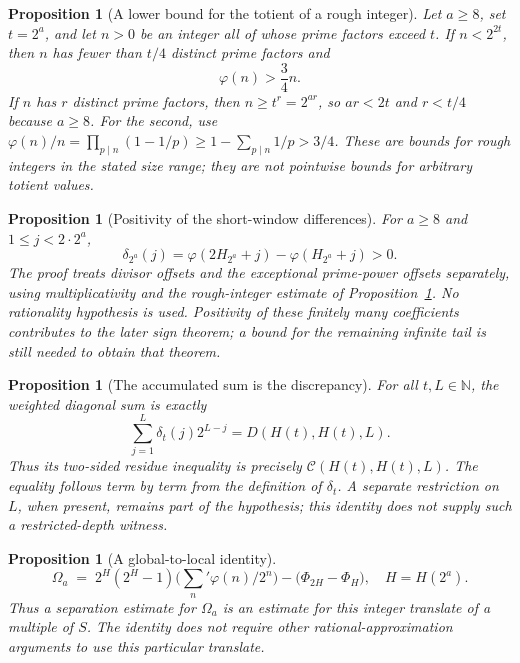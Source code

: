\documentclass[11pt]{article}
\theoremstyle{plain}
\newtheorem{prop}[thm]{Proposition}
\theoremstyle{definition}
\theoremstyle{remark}
\begin{document}
\begin{prop}[A lower bound for the totient of a rough integer]\label{prop:AR-03-inv}
Let $a\ge8$, set $t=2^a$, and let $n>0$ be an integer all of
whose prime factors exceed $t$. If $n<2^{2t}$, then $n$ has fewer
than $t/4$ distinct prime factors and
\[
 \varphi(n)>\frac34 n.
\]
If $n$ has $r$ distinct prime factors, then
$n\ge t^r=2^{ar}$, so $ar<2t$ and $r<t/4$ because $a\ge8$.
For the second, use
$\varphi(n)/n=\prod_{p\mid n}(1-1/p)\ge1-\sum_{p\mid n}1/p>3/4$.
These are bounds for rough integers in the stated size range; they are
not pointwise bounds for arbitrary totient values.

\end{prop}

\begin{prop}[Positivity of the short-window differences]\label{prop:AR-05-inv}
For $a\ge8$ and $1\le j<2\cdot2^a$,
\[
 \delta_{2^a}(j)=\varphi(2H_{2^a}+j)-\varphi(H_{2^a}+j)>0.
\]
The proof treats divisor offsets and the exceptional prime-power
offsets separately, using multiplicativity and the rough-integer
estimate of Proposition~\ref{prop:AR-03-inv}. No rationality hypothesis
is used. Positivity of these finitely many coefficients contributes to
the later sign theorem; a bound for the remaining infinite tail is
still needed to obtain that theorem.

\end{prop}

\begin{prop}[The accumulated sum is the discrepancy]\label{prop:AR-06-inv}
For all $t,L\in\mathbb N$, the weighted diagonal sum is exactly
\[
 \sum_{j=1}^{L}\delta_t(j)2^{L-j}=D(H(t),H(t),L).
\]
Thus its two-sided residue inequality is precisely
$\mathcal C(H(t),H(t),L)$. The equality follows term by term from the
definition of $\delta_t$. A separate restriction on $L$, when present,
remains part of the hypothesis; this identity does not supply such a
restricted-depth witness.

\end{prop}

\begin{prop}[A global-to-local identity]\label{prop:SEP-01-inv}
\[
\Omega_a \;=\; 2^H(2^H-1)\Big(\textstyle\sum_n' \varphi(n)/2^n\Big) - \big(\Phi_{2H}-\Phi_H\big),\quad H={H}(2^a).
\]
Thus a separation estimate for $\Omega_a$ is an estimate for this
integer translate of a multiple of $S$. The identity does not require
other rational-approximation arguments to use this particular translate.
\end{prop}
\end{document}
